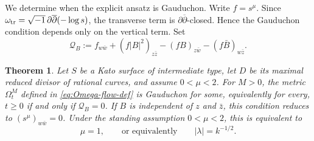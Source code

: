 \documentclass[12pt]{amsart}
\numberwithin{equation}{section}
\newcommand{\ddbar}{\sqrt{-1}\,\partial\overline\partial}
\newtheorem{theorem}{Theorem}
\theoremstyle{remark}
\theoremstyle{definition}
\begin{document}
We determine when the explicit ansatz is Gauduchon. Write $f=s^\mu$.
Since $\omega_{\rm tr}=\ddbar(-\log s)$, the transverse term is
$\partial\overline{\partial}$-closed. Hence the Gauduchon condition depends
only on the vertical term. Set
\begin{equation*}
\mathcal Q_B
:=
f_{w\bar w}
+
(f|B|^2)_{z\bar z}
-
(fB)_{z\bar w}
-
(f\bar B)_{w\bar z}.
\end{equation*}

\begin{theorem}
\label{thm:gauduchon-criterion-explicit-ansatz}
Let $S$ be a Kato surface of intermediate type, let $D$ be its maximal reduced divisor of rational curves, and assume $0<\mu<2$. For $M>0$, the metric $\Omega_t^M$ defined in \eqref{eq:Omega-flow-def} is Gauduchon for some, equivalently for every, $t\geq0$
if and only if $\mathcal Q_B=0$. If $B$ is independent of $z$ and $\bar z$, this condition reduces to $(s^\mu)_{w\bar w}=0$.
Under the standing assumption $0<\mu<2$, this is equivalent to
\begin{equation*}
\mu=1,
\qquad\text{or equivalently}\qquad
|\lambda|=k^{-1/2}.
\end{equation*}
\end{theorem}
\end{document}
